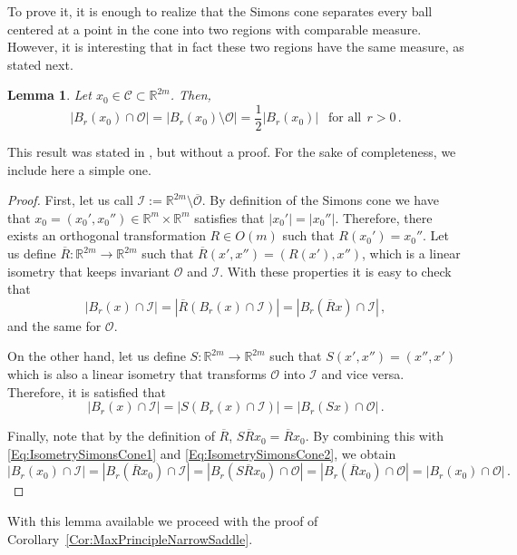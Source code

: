 \documentclass[12pt,reqno]{amsart}
\newtheorem{lemma}[theorem]{Lemma}
\theoremstyle{definition}
\theoremstyle{remark}
\newcommand{\con}[1]{\mathbb{#1}}
\newcommand{\R}{\con{R}} %
\newcommand{\ccal}{\mathscr{C}}
\newcommand{\ical}{\mathcal{I}}
\newcommand{\ocal}{\mathcal{O}}
\numberwithin{equation}{section}
\begin{document}
To prove it, it is enough to realize that the Simons cone separates every ball centered at a point in the cone into two regions with comparable measure. However, it is interesting that in fact these two regions have the same measure, as stated next.

\begin{lemma}
\label{Lemma:HalfBallSimonsCone}
Let $x_0\in \ccal\subset \R^{2m}$. Then, 
$$ | B_r(x_0)\cap \ocal| = | B_r(x_0)\setminus \ocal| = \frac{1}{2} |B_r(x_0)| \ \ \textrm{ for all} \ \ r>0\,. $$
\end{lemma}

This result was stated in \cite{Cabre-Saddle}, but without a proof. For the sake of completeness, we include here a simple one.

\begin{proof}
First, let us call $\ical := \R^{2m}\setminus \overline{\ocal}$. By definition of the Simons cone we have that $x_0 = (x_0',x_0'')\in \R^m \times \R^m$ satisfies that $|x_0'|=|x_0''|$. Therefore, there exists an orthogonal transformation $R\in O(m)$ such that $R(x_0') = x_0''$. Let us define $\overline{R}:\R^{2m}\to\R^{2m}$ such that $\overline{R}(x',x'') = (R(x'),x'')$, which is a linear isometry that keeps invariant $\ocal$ and $\ical$. With these properties it is easy to check that
\begin{equation}
\label{Eq:IsometrySimonsCone1}
|B_r(x)\cap \ical| = |\overline{R} \left( B_r(x)\cap \ical\right)| = | B_r(\overline{R}x) \cap \ical |\,,
\end{equation}
and the same for $\ocal$.

On the other hand, let us define $S:\R^{2m}\to\R^{2m}$ such that $S(x',x'') = (x'',x')$ which is also a linear isometry that transforms $\ocal$ into $\ical$ and vice versa. Therefore, it is satisfied that
\begin{equation}
\label{Eq:IsometrySimonsCone2}
|B_r(x)\cap \ical| = |S \left( B_r(x)\cap \ical\right)| = | B_r(Sx) \cap \ocal |\,.
\end{equation}

Finally, note that by the definition of $\overline{R}$, $S\overline{R} x_0 = \overline{R} x_0$. By combining this with \eqref{Eq:IsometrySimonsCone1} and \eqref{Eq:IsometrySimonsCone2}, we obtain
$$ |B_r(x_0)\cap \ical| = | B_r(\overline{R}x_0) \cap \ical | = | B_r(S\overline{R}x_0) \cap \ocal | = | B_r(\overline{R}x_0) \cap \ocal | = |B_r(x_0)\cap \ocal|\,. $$
\end{proof}

With this lemma available we proceed with the proof of Corollary~\ref{Cor:MaxPrincipleNarrowSaddle}.
\end{document}
